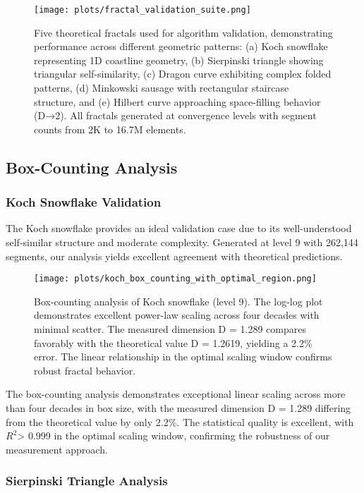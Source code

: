\documentclass[preprint,12pt]{elsarticle}
\begin{document}
\begin{figure}[ht]
\centering
\texttt{[image: plots/fractal\_validation\_suite.png]}
\caption{Five theoretical fractals used for algorithm validation, demonstrating performance across different geometric patterns: (a) Koch snowflake representing 1D coastline geometry, (b) Sierpinski triangle showing triangular self-similarity, (c) Dragon curve exhibiting complex folded patterns, (d) Minkowski sausage with rectangular staircase structure, and (e) Hilbert curve approaching space-filling behavior (D→2). All fractals generated at convergence levels with segment counts from 2K to 16.7M elements.}
\label{fig:five_fractals}
\end{figure}

\subsection{Box-Counting Analysis}

\subsubsection{Koch Snowflake Validation}

The Koch snowflake provides an ideal validation case due to its well-understood self-similar structure and moderate complexity. Generated at level 9 with 262,144 segments, our analysis yields excellent agreement with theoretical predictions.

\begin{figure}[ht]
\centering
\texttt{[image: plots/koch\_box\_counting\_with\_optimal\_region.png]}
\caption{Box-counting analysis of Koch snowflake (level 9). The log-log plot demonstrates excellent power-law scaling across four decades with minimal scatter. The measured dimension D = 1.289 compares favorably with the theoretical value D = 1.2619, yielding a 2.2\% error. The linear relationship in the optimal scaling window confirms robust fractal behavior.}
\label{fig:koch_boxcounting}
\end{figure}

The box-counting analysis demonstrates exceptional linear scaling across more than four decades in box size, with the measured dimension D = 1.289 differing from the theoretical value by only 2.2\%. The statistical quality is excellent, with$R^2$> 0.999 in the optimal scaling window, confirming the robustness of our measurement approach.

\subsubsection{Sierpinski Triangle Analysis}
\end{document}
